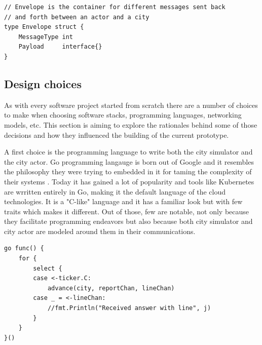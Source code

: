 \documentclass[conference]{IEEEtran}
\begin{document}
\begin{lstlisting}[caption=Go top level struct (envelope), label=lst:goenvelope]
// Envelope is the container for different messages sent back
// and forth between an actor and a city
type Envelope struct {
    MessageType int
    Payload     interface{}
}
\end{lstlisting}

\subsection{Design choices}
\label{subsec:designchoices}

As with every software project started from scratch there are a number of choices to make when choosing software stacks, programming languages, networking models, etc. This section is aiming to explore the rationales behind some of those decisions and how they influenced the building of the current prototype.

A first choice is the programming language to write both the city simulator and the city actor. Go programming langauge is born out of Google and it resembles the philosophy they were trying to embedded in it for taming the complexity of their systems \cite{donovan2015go}. Today it has gained a lot of popularity and tools like Kubernetes are wrritten entirely in Go, making it the default language of the cloud technologies. It is a "C-like" language and it has a familiar look but with few traits which makes it different. Out of those, few are notable, not only because they facilitate programming endeavors but also because both city simulator and city actor are modeled around them in their communications. 

\begin{lstlisting}[caption=Go routine from city actor, label=lst:goroutine]
go func() {
	for {
		select {
		case <-ticker.C:
			advance(city, reportChan, lineChan)
		case _ = <-lineChan:
			//fmt.Println("Received answer with line", j)
		}
	}
}()
\end{lstlisting}
\end{document}

